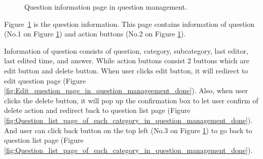 \documentclass[12pt,oneside,openright,a4paper]{cpe-english-project}
\begin{document}
		\begin{figure}[!h]\centering
			\caption{Question information page in question management.}\label{fig:Question_information_page_in_question_management_done}
		\end{figure}
		\begin{flushleft}
			Figure~\ref*{fig:Question_information_page_in_question_management_done} is the question information. This page contains information of question (No.1 on Figure \ref*{fig:Question_information_page_in_question_management_done}) and action buttons (No.2 on Figure \ref*{fig:Question_information_page_in_question_management_done}).
		\end{flushleft}
		\begin{flushleft}
			Information of question consists of question, category, subcategory, last editor, last edited time, and answer. While action buttons consist 2 buttons which are edit button and delete button. When user clicks edit button, it will redirect to edit question page (Figure \ref*{fig:Edit_question_page_in_question_manageement_done}). Also, when user clicks the delete button, it will pop up the confirmation box to let user confirm of delete action and redirect back to question list page (Figure \ref*{fig:Question_list_page_of_each_category_in_question_management_done}). And user can click back button on the top left (No.3 on Figure \ref*{fig:Question_information_page_in_question_management_done}) to go back to question list page (Figure \ref*{fig:Question_list_page_of_each_category_in_question_management_done}).
		\end{flushleft}
\end{document}
